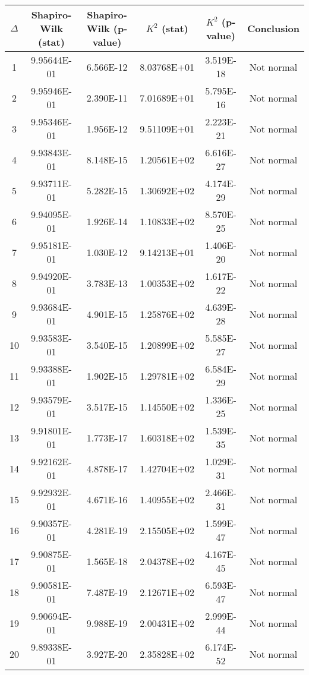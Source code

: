 \begin{table}[h]
	\begin{tabular}{|c|c|c|c|c|c|}
		\hline
		$\Delta$ &  Shapiro-Wilk (stat) & Shapiro-Wilk (p-value) & $K^2$ (stat) & $K^2$ (p-value) & Conclusion\\\hline
		\hline
		1 & 9.95644E-01 & 6.566E-12 & 8.03768E+01 & 3.519E-18 & Not normal\\\hline
		2 & 9.95946E-01 & 2.390E-11 & 7.01689E+01 & 5.795E-16 & Not normal\\\hline
		3 & 9.95346E-01 & 1.956E-12 & 9.51109E+01 & 2.223E-21 & Not normal\\\hline
		4 & 9.93843E-01 & 8.148E-15 & 1.20561E+02 & 6.616E-27 & Not normal\\\hline
		5 & 9.93711E-01 & 5.282E-15 & 1.30692E+02 & 4.174E-29 & Not normal\\\hline
		6 & 9.94095E-01 & 1.926E-14 & 1.10833E+02 & 8.570E-25 & Not normal\\\hline
		7 & 9.95181E-01 & 1.030E-12 & 9.14213E+01 & 1.406E-20 & Not normal\\\hline
		8 & 9.94920E-01 & 3.783E-13 & 1.00353E+02 & 1.617E-22 & Not normal\\\hline
		9 & 9.93684E-01 & 4.901E-15 & 1.25876E+02 & 4.639E-28 & Not normal\\\hline
		10 & 9.93583E-01 & 3.540E-15 & 1.20899E+02 & 5.585E-27 & Not normal\\\hline
		11 & 9.93388E-01 & 1.902E-15 & 1.29781E+02 & 6.584E-29 & Not normal\\\hline
		12 & 9.93579E-01 & 3.517E-15 & 1.14550E+02 & 1.336E-25 & Not normal\\\hline
		13 & 9.91801E-01 & 1.773E-17 & 1.60318E+02 & 1.539E-35 & Not normal\\\hline
		14 & 9.92162E-01 & 4.878E-17 & 1.42704E+02 & 1.029E-31 & Not normal\\\hline
		15 & 9.92932E-01 & 4.671E-16 & 1.40955E+02 & 2.466E-31 & Not normal\\\hline
		16 & 9.90357E-01 & 4.281E-19 & 2.15505E+02 & 1.599E-47 & Not normal\\\hline
		17 & 9.90875E-01 & 1.565E-18 & 2.04378E+02 & 4.167E-45 & Not normal\\\hline
		18 & 9.90581E-01 & 7.487E-19 & 2.12671E+02 & 6.593E-47 & Not normal\\\hline
		19 & 9.90694E-01 & 9.988E-19 & 2.00431E+02 & 2.999E-44 & Not normal\\\hline
		20 & 9.89338E-01 & 3.927E-20 & 2.35828E+02 & 6.174E-52 & Not normal\\\hline

\end{tabular}
\end{table}
